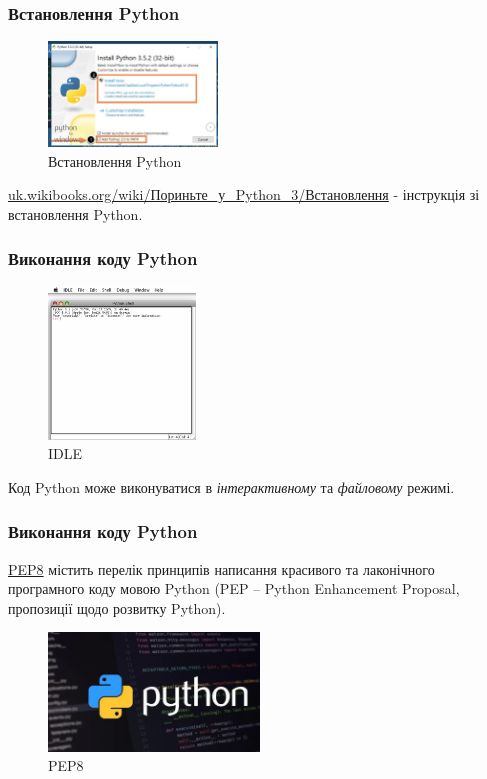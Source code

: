 \begin{frame}
\frametitle{Встановлення Python}
\begin{figure}
\begin{center}
 \includegraphics[width=0.4\textwidth]{pictures/python_install.jpg}
\caption{Встановлення Python}
\label{python_install} 
\end{center}
\end{figure}
\tiny{\href{https://uk.wikibooks.org/wiki/}{uk.wikibooks.org/wiki/Пориньте\_у\_Python\_3/Встановлення} - інструкція зі встановлення Python.}
\end{frame}

\begin{frame}
\frametitle{Виконання коду Python}

\begin{figure}
\includegraphics[width=0.35\textwidth]{pictures/idle.png}
\caption{IDLE}
\label{myphoto}
\end{figure}

Код Python може виконуватися в \textit{інтерактивному} та \textit{файловому} режимі.
\end{frame}


\begin{frame}
\frametitle{Виконання коду Python}
\href{https://it-need.com/pep-8-posibnyk-z-napysannya-kodu-na-python/}{PEP8} містить перелік принципів написання красивого та лаконічного програмного коду мовою Python (PEP – Python Enhancement Proposal, пропозиції щодо розвитку Python).
\begin{figure}
\begin{center}
 \includegraphics[width=0.5\textwidth]{pictures/pep8.png}
\caption{PEP8}
\label{python_site} 
\end{center}
\end{figure}
\end{frame}


